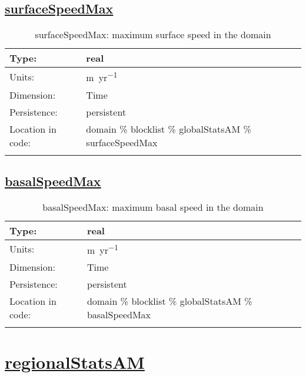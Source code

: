 \subsection[surfaceSpeedMax]{\hyperref[sec:var_tab_globalStatsAM]{surfaceSpeedMax}}
\label{subsec:var_sec_globalStatsAM_surfaceSpeedMax}
\begin{center}
\begin{longtable}{| p{2.0in} | p{4.0in} |}
        \hline 
        Type: & real \\
        \hline 
        Units: & \si{m.yr^{-1}} \\
        \hline 
        Dimension: & Time \\
        \hline 
        Persistence: & persistent \\
        \hline 
         Location in code: & domain \% blocklist \% globalStatsAM \% surfaceSpeedMax \\
         \hline 
    \caption{surfaceSpeedMax: maximum surface speed in the domain}
\end{longtable}
\end{center}
\subsection[basalSpeedMax]{\hyperref[sec:var_tab_globalStatsAM]{basalSpeedMax}}
\label{subsec:var_sec_globalStatsAM_basalSpeedMax}
\begin{center}
\begin{longtable}{| p{2.0in} | p{4.0in} |}
        \hline 
        Type: & real \\
        \hline 
        Units: & \si{m.yr^{-1}} \\
        \hline 
        Dimension: & Time \\
        \hline 
        Persistence: & persistent \\
        \hline 
         Location in code: & domain \% blocklist \% globalStatsAM \% basalSpeedMax \\
         \hline 
    \caption{basalSpeedMax: maximum basal speed in the domain}
\end{longtable}
\end{center}
\section[regionalStatsAM]{\hyperref[sec:var_tab_regionalStatsAM]{regionalStatsAM}}
\label{sec:var_sec_regionalStatsAM}
